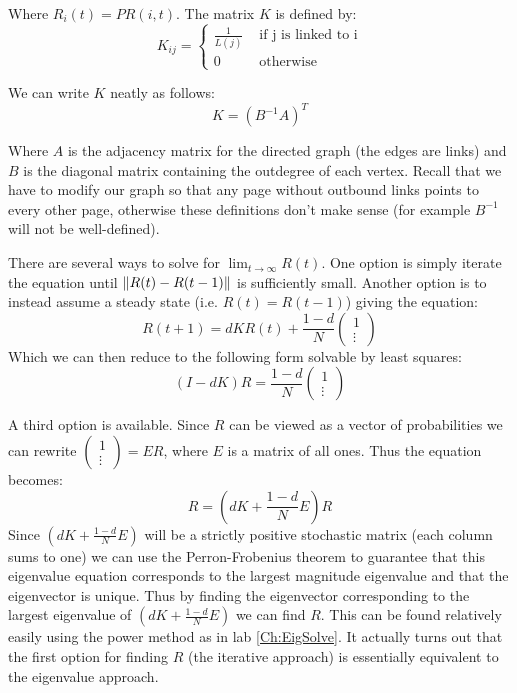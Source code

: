 Where $R_i(t) = PR(i,t)$. The matrix $K$ is defined by:
\[
K_{ij} = \begin{cases} \frac{1}{L(j)} & \mbox{ if j is linked to i} \\ 0 & \mbox{ otherwise} \end{cases}
\]

We can write $K$ neatly as follows:
\[
K = (B^{-1}A)^T
\]

Where $A$ is the adjacency matrix for the directed graph (the edges are links) and $B$ is the diagonal matrix containing the outdegree of each vertex.
Recall that we have to modify our graph so that any page without outbound links points to every other page, otherwise these definitions don't make sense (for example $B^{-1}$ will not be well-defined).

There are several ways to solve for $\lim_{t \to \infty} R(t)$.
One option is simply iterate the equation until $\left\lVert R(t)-R(t-1)\right\rVert$ is sufficiently small.
Another option is to instead assume a steady state (i.e. $R(t) = R(t-1)$) giving the equation:
\[
R(t+1) = d K R(t) + \frac{1-d}{N} \begin{pmatrix}1\\\vdots\end{pmatrix}
\]
Which we can then reduce to the following form solvable by least squares:
\[
(I-dK)R = \frac{1-d}{N} \begin{pmatrix}1\\\vdots\end{pmatrix}
\]

A third option is available.
Since $R$ can be viewed as a vector of probabilities we can rewrite $\left(\begin{smallmatrix}1\\\vdots\end{smallmatrix}\right) = E R$, where $E$ is a matrix of all ones.
Thus the equation becomes:
\[
R = (dK + \frac{1-d}{N}E)R
\]
Since $(dK + \frac{1-d}{N}E)$ will be a strictly positive stochastic matrix (each column sums to one) we can use the Perron-Frobenius theorem to guarantee that this eigenvalue equation corresponds to the largest magnitude eigenvalue and that the eigenvector is unique.
Thus by finding the eigenvector corresponding to the largest eigenvalue of $(dK + \frac{1-d}{N}E)$ we can find $R$.
This can be found relatively easily using the power method as in lab \ref{Ch:EigSolve}.
It actually turns out that the first option for finding $R$ (the iterative approach) is essentially equivalent to the eigenvalue approach.

